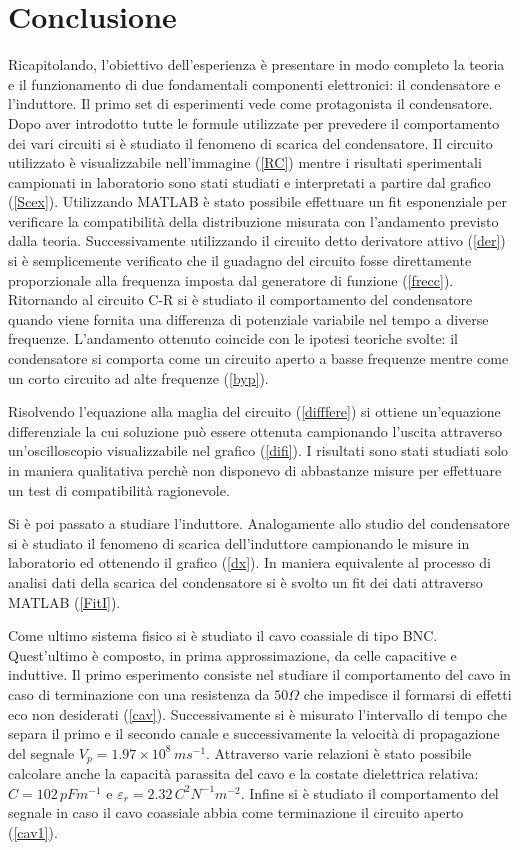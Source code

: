 \documentclass[11pt]{article}
\begin{document}
\section{Conclusione}
Ricapitolando, l'obiettivo dell'esperienza è presentare in modo completo la teoria e il funzionamento di due fondamentali componenti elettronici: il condensatore e l'induttore. Il primo set di esperimenti vede come protagonista il condensatore. Dopo aver introdotto tutte le formule utilizzate per prevedere il comportamento dei vari circuiti si è studiato il fenomeno di scarica del condensatore. Il circuito utilizzato è visualizzabile nell'immagine (\ref{RC}) mentre i risultati sperimentali campionati in laboratorio sono stati studiati e interpretati a partire dal grafico (\ref{Scex}). Utilizzando MATLAB è stato possibile effettuare un fit esponenziale per verificare la compatibilità della distribuzione misurata con l'andamento previsto dalla teoria. Successivamente utilizzando il circuito detto derivatore attivo (\ref{der}) si è semplicemente verificato che il guadagno del circuito fosse direttamente proporzionale alla frequenza imposta dal generatore di funzione (\ref{frecc}). Ritornando al circuito C-R si è studiato il comportamento del condensatore quando viene fornita una differenza di potenziale variabile nel tempo a diverse frequenze. L'andamento ottenuto coincide con le ipotesi teoriche svolte: il condensatore si comporta come un circuito aperto a basse frequenze mentre come un corto circuito ad alte frequenze (\ref{byp}).

Risolvendo l'equazione alla maglia del circuito (\ref{difffere}) si ottiene un'equazione differenziale la cui soluzione può essere ottenuta campionando l'uscita attraverso un'oscilloscopio visualizzabile nel grafico (\ref{difi}). I risultati sono stati studiati solo in maniera qualitativa perchè non disponevo di abbastanze misure per effettuare un test di compatibilità ragionevole.

Si è poi passato a studiare l'induttore. Analogamente allo studio del condensatore si è studiato il fenomeno di scarica dell'induttore campionando le misure in laboratorio ed ottenendo il grafico (\ref{dx}). In maniera equivalente al processo di analisi dati della scarica del condensatore si è svolto un fit dei dati attraverso MATLAB (\ref{FitI}).

Come ultimo sistema fisico si è studiato il cavo coassiale di tipo BNC. Quest'ultimo è composto, in prima approssimazione, da celle capacitive e induttive. Il primo esperimento consiste nel studiare il comportamento del cavo in caso di terminazione con una resistenza da $50\Omega$ che impedisce il formarsi di effetti eco non desiderati (\ref{cav}). Successivamente si è misurato l'intervallo di tempo che separa il primo e il secondo canale e successivamente la velocità di propagazione del segnale $V_p=1.97\times10^8\,ms^{-1}$. Attraverso varie relazioni è stato possibile calcolare anche la capacità parassita del cavo e la costate dielettrica relativa: $C=102\,pFm^{-1}$ e $\varepsilon_r=2.32\,C^2N^{-1}m^{-2}$. Infine si è studiato il comportamento del segnale in caso il cavo coassiale abbia come terminazione il circuito aperto (\ref{cav1}).
\end{document}
